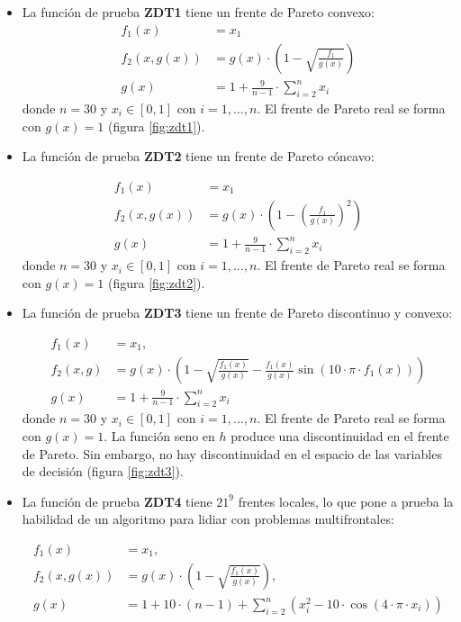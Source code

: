 \begin{itemize}

\item La funci\'on de prueba \textbf{ZDT1} tiene un frente de Pareto convexo:
\begin{align*}
f_1(x)&=x_1\\
f_2(x,g(x))&=g(x)\cdot\left(1-\sqrt{ \frac{f_1}{g(x)}}\right)\\
g(x)&=1+\frac{9}{n-1}\cdot\sum_{i=2}^nx_i
\end{align*}
donde $n=30$ y $x_i\in[0,1]$ con $i=1,\ldots, n$. El frente de Pareto real se forma con $g(x)=1$ (figura \ref{fig:zdt1}).

\item La funci\'on de prueba \textbf{ZDT2} tiene un frente de Pareto c\'oncavo:

\begin{align*}
f_1(x)&=x_1\\
f_2(x,g(x))&=g(x)\cdot(1- \left( \frac{f_1}{g(x)}\right)^2)\\
g(x)&=1+\frac{9}{n-1}\cdot\sum_{i=2}^nx_i
\end{align*}
donde $n=30$ y $x_i\in[0,1]$ con $i=1,\ldots, n$. El frente de Pareto real se forma con $g(x)=1$ (figura \ref{fig:zdt2}).

\item La funci\'on de prueba \textbf{ZDT3} tiene un frente de Pareto discontinuo y convexo:

\begin{align*}
f_1(x)&=x_1,\\
f_2(x,g)&=g(x)\cdot\left(1-\sqrt{\frac{f_1(x)}{g(x)}}-\frac{f_1(x)}{g(x)}\sin(10\cdot\pi\cdot f_1(x))\right)\\
g(x)&=1+\frac{9}{n-1}\cdot\sum_{i=2}^nx_i
\end{align*}
donde $n=30$ y $x_i\in[0,1]$ con $i=1,\ldots, n$. El frente de Pareto real se forma con $g(x)=1$. La funci\'on seno
en $h$ produce una discontinuidad en el frente de Pareto. Sin embargo, no hay discontinuidad en el espacio de las variables 
de decisi\'on (figura \ref{fig:zdt3}).

\item La funci\'on de prueba \textbf{ZDT4} tiene $21^9$ frentes locales, lo que pone a prueba la habilidad de un 
algoritmo para lidiar con problemas multifrontales:

\begin{align*}
f_1(x)&=x_1,\\
f_2(x,g(x))&=g(x)\cdot \left(1-\sqrt{ \frac{f_1(x)}{g(x)}}\right),\\
g(x)&=1+10\cdot(n-1)+ \sum_{i=2}^n(x_i^2-10\cdot \cos(4\cdot\pi\cdot x_i))
\end{align*}


\end{itemize}
